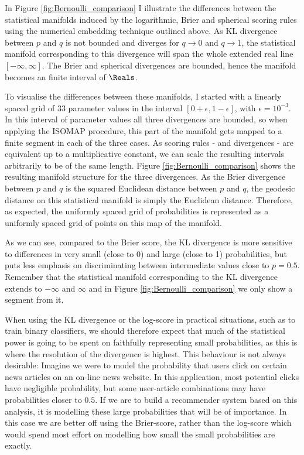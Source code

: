 In Figure \ref{fig:Bernoulli_comparison} I illustrate the differences between the statistical manifolds induced by the logarithmic, Brier and spherical scoring rules using the numerical embedding technique outlined above. As KL divergence between $p$ and $q$ is not bounded and diverges for $q\rightarrow 0$ and $q\rightarrow 1$, the statistical manifold corresponding to this divergence will span the whole extended real line $[-\infty,\infty]$. The Brier and spherical divergences are bounded, hence the manifold becomes an finite interval of $\Reals$.

To visualise the differences between these manifolds, I started with a linearly spaced grid of $33$ parameter values in the interval $[0+\epsilon,1-\epsilon]$, with $\epsilon = 10^{-3}$. In this interval of parameter values all three divergences are bounded, so when applying the ISOMAP procedure, this part of the manifold gets mapped to a finite segment in each of the three cases. As scoring rules - and divergences - are equivalent up to a multiplicative constant, we can scale the resulting intervals arbitrarily to be of the same length. Figure \ref{fig:Bernoulli_comparison} shows the resulting manifold structure for the three divergences. As the Brier divergence between $p$ and $q$ is the squared Euclidean distance between $p$ and $q$, the geodesic distance on this statistical manifold is simply the Euclidean distance. Therefore, as expected, the uniformly spaced grid of probabilities is represented as a uniformly spaced grid of points on this map of the manifold.

As we can see, compared to the Brier score, the KL divergence is more sensitive to differences in very small (close to 0) and large (close to 1) probabilities, but puts less emphasis on discriminating between intermediate values close to $p=0.5$. Remember that the statistical manifold corresponding to the KL divergence extends to $-\infty$ and $\infty$ and in Figure \ref{fig:Bernoulli_comparison} we only show a segment from it.

When using the KL divergence or the log-score in practical situations, such as to train binary classifiers, we should therefore expect that much of the statistical power is going to be spent on faithfully representing small probabilities, as this is where the resolution of the divergence is highest. This behaviour is not always desirable: Imagine we were to model the probability that users click on certain news articles on an on-line news website. In this application, most potential clicks have negligible probability, but some user-article combinations may have probabilities closer to $0.5$. If we are to build a recommender system based on this analysis, it is modelling these large probabilities that will be of importance. In this case we are better off using the Brier-score, rather than the log-score which would spend most effort on modelling how small the small probabilities are exactly.

